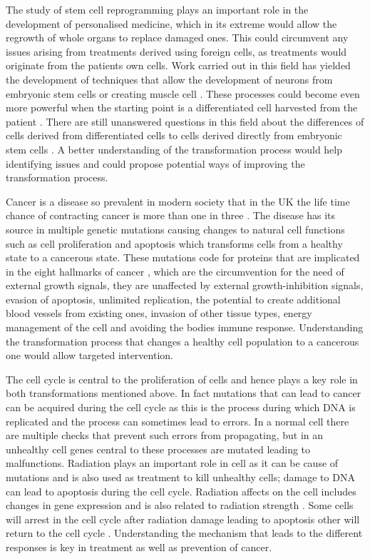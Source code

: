 The study of stem cell reprogramming plays an important role in the development of personalised medicine, which in its extreme would allow the regrowth of whole organs to replace damaged ones. This could circumvent any issues arising from treatments derived using foreign cells, as treatments would originate from the patients own cells. Work carried out in this field has yielded the development of techniques that allow the development of neurons from embryonic stem cells \citep{Vierbuchen:2010fa, Pang:2011ce} or creating muscle cell \citep{Ieda:2010ir, Efe:2011bpa}. These processes could become even more powerful when the starting point is a differentiated cell harvested from the patient \citep{Takahashi:2006hi}. There are still unanswered questions in this field about the differences of cells derived from differentiated cells to cells derived directly from embryonic stem cells \citep{Carey:2011bs, Bock:2011kx}. A better understanding of the transformation process would help identifying issues and could propose potential ways of improving the transformation process. 

Cancer is a disease so prevalent in modern society that in the UK the life time chance of contracting cancer is more than one in three \citep{Sasieni:2011}. The disease has its source in multiple genetic mutations causing changes to natural cell functions such as cell proliferation and apoptosis which transforms cells from a healthy state to a cancerous state. These mutations code for proteins that are implicated in the eight hallmarks of cancer \citep{Hanahan:2011gu}, which are the circumvention for the need of external growth signals, they are unaffected by external growth-inhibition signals, evasion of apoptosis, unlimited replication, the potential to create additional blood vessels from existing ones, invasion of other tissue types, energy management of the cell and avoiding the bodies immune response. Understanding the transformation process that changes a healthy cell population to a cancerous one would allow targeted intervention. 

The cell cycle is central to the proliferation of cells and hence plays a key role in both transformations mentioned above. In fact mutations that can lead to cancer can be acquired during the cell cycle as this is the process during which DNA is replicated and the process can sometimes lead to errors. In a normal cell there are multiple checks that prevent such errors from propagating, but in an unhealthy cell genes central to these processes are mutated leading to malfunctions. Radiation plays an important role in cell as it can be cause of mutations and is also used as treatment to kill unhealthy cells; damage to DNA can lead to apoptosis during the cell cycle. Radiation affects on the cell includes changes in gene expression and is also related to radiation strength \cite{Gentile:2003in}. Some cells will arrest in the cell cycle after radiation damage leading to apoptosis other will return to the cell cycle \cite{Pawlik2004928}. Understanding the mechanism that leads to the different responses is key in treatment as well as prevention of cancer. 

